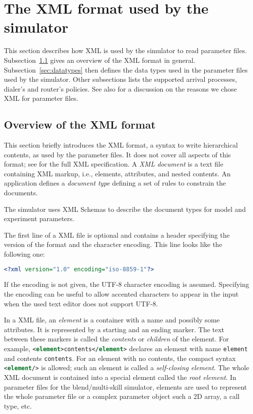 \section{The XML format used by the simulator}
\label{sec:mskxml}

This section describes how XML is used by the simulator to read
parameter files.
Subsection~\ref{sec:xmloverview} gives an overview of the XML format
in general.
Subsection~\ref{sec:datatypes} then defines
the data types used in the parameter files used by the simulator.
Other subsections lists the supported arrival processes, dialer's and
router's policies.
See also
\cite[section 3.6.1]{iBUI05b} for a discussion on the reasons we chose
XML for parameter files.

\subsection{Overview of the XML format}
\label{sec:xmloverview}

This section briefly introduces the XML format, a syntax to write
hierarchical contents, as used by the
parameter files.  It does not cover all aspects of this format;
see \cite{iYER04a} for the full XML specification.
A \emph{XML document} is a text file containing XML markup, i.e.,
elements, attributes, and nested contents.
An application defines a \emph{document type} defining a set of rules
to constrain the documents.

The simulator uses XML Schemas to describe the document types for
model and experiment parameters.

The first line of a XML file is optional and contains a header
specifying the version of the format and the character encoding.  This
line looks
like the following one:
\begin{lstlisting}[language=XML, frame={}]
<?xml version="1.0" encoding="iso-8859-1"?>
\end{lstlisting}
If the encoding is not given, the UTF-8 character encoding is
assumed.
Specifying the encoding can be useful to allow accented characters to
appear in the input when the used text editor does not support UTF-8.

In a XML file, an \emph{element} is a container with a name
and possibly some attributes.  It is represented by a starting and an
ending marker.  The text between these markers is called the
\emph{contents} or \emph{children} of the element.  For example,
\lstinline[language=XML]{<element>contents</element>} declares an
element with name
\texttt{element} and contents \texttt{contents}.
For an element with no
contents, the compact syntax
\lstinline[language=XML]{<element/>} is allowed; such an element
is called a
\emph{self-closing element}.  The whole XML document is contained into
a special element called the \emph{root element}.
In parameter files for the blend/multi-skill simulator, elements are used
to represent the
whole parameter file or a complex parameter object such a 2D array,
a call type, etc.

